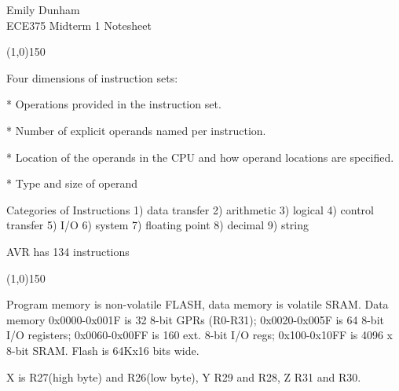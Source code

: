 \documentclass[8pt]{article}
\begin{document}
\begin{multicols}{3}
Emily Dunham\\
ECE375 Midterm 1 Notesheet

\line(1,0){150}

Four dimensions of instruction sets:                                            
                                                                                
* Operations provided in the instruction set.                                   
                                                                                
* Number of explicit operands named per instruction.                            
                                                                                
* Location of the operands in the CPU and how                                   
  operand locations are specified.                                              
                                                                                  
  * Type and size of operand                                                      
                                                                                  
  Categories of Instructions                                                      
  1) data transfer                                                                
  2) arithmetic                                                                   
  3) logical                                                                      
  4) control transfer                                                             
  5) I/O                                                                          
  6) system                                                                       
  7) floating point                                                               
  8) decimal                                                                      
  9) string 

AVR has 134 instructions

\line(1,0){150}

Program memory is non-volatile FLASH, data memory is volatile SRAM. Data
memory 0x0000-0x001F is 32 8-bit GPRs (R0-R31); 0x0020-0x005F is 64 8-bit I/O
registers; 0x0060-0x00FF is 160 ext. 8-bit I/O regs; 0x100-0x10FF is 4096 x
8-bit SRAM. Flash is 64Kx16 bits wide.

X is R27(high byte) and R26(low byte), Y R29 and R28, Z R31 and R30.


\end{multicols}
\end{document}
